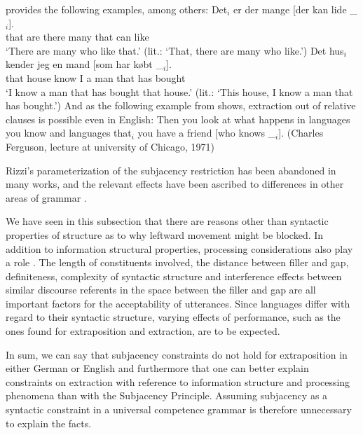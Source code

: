 \citet[]{Erteschik73a-u} provides the following examples, among others:
\eal
\label{Beispiel-Extraktion-Adjunkt}
\ex
\gll Det$_i$ er   der mange [der kan lide \_$_i$].\\
     that are there  many \hspaceThis{[}that can like\\
\glt `There are many who like that.' (lit.: `That, there are many who like.')
\ex
\gll Det    hus$_i$  kender jeg en    mand [som har købt \_$_i$].\\
     that   house  know  I a man \hspaceThis{[}that has bought\\
\glt `I know a man that has bought that house.' (lit.: `This house, I know a man that has bought.')
\zl
And as the following example from \citet[]{McCawley81b-u} shows, extraction out of relative
clauses is possible even in English:
\ea
Then you look at what happens in languages you know and languages that$_i$ you have a friend [who
  knows \_$_i$]. (Charles Ferguson, lecture at university of Chicago, 1971)
\z

Rizzi's parameterization of the subjacency restriction has been abandoned in many works, and the relevant effects have been
ascribed to differences in other areas of grammar \citep{Adams84a,CMC83a,Grimshaw86b,Kluender92a}.


We have seen in this subsection that there are reasons other than syntactic properties of structure as to why leftward movement might be blocked.
In addition to information structural properties, processing considerations\label{Seite-Subjazenz-Performanz}
also play a role \citep*{Grosu73a,EC2000a,Gibson98a,KK93a,Hawkins99a,SHS2007a}.
The length of constituents involved, the distance between filler and gap, definiteness, complexity of syntactic structure and
interference effects between similar discourse referents in the space between the filler and gap are all important factors for
the acceptability of utterances. Since languages differ with regard to their syntactic structure,
varying effects of performance, such as the ones found for extraposition and extraction, are to be expected. 

In sum, we can say that subjacency constraints do not hold for extraposition in either German or English and furthermore that one can better
explain constraints on extraction with reference to information structure and processing phenomena than with the Subjacency Principle.
Assuming subjacency as a syntactic constraint in a universal competence grammar is therefore unnecessary to explain the facts.


